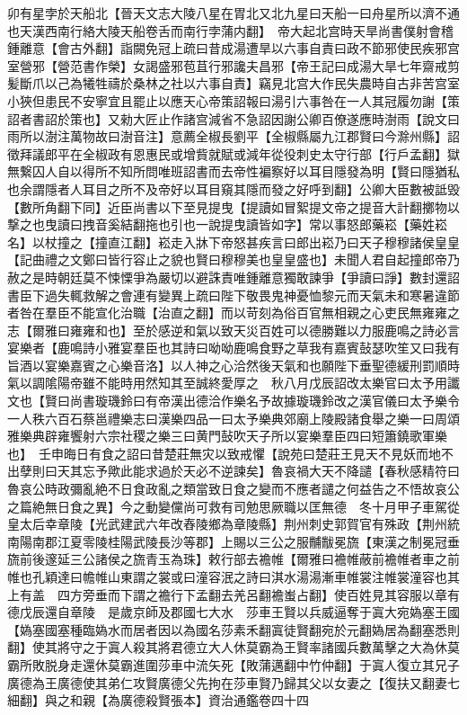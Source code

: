 卯有星孛於天船北【晉天文志大陵八星在胃北又北九星曰天船一曰舟星所以濟不通也天漢西南行絡大陵天船卷舌而南行孛蒲内翻】　帝大起北宫時天旱尚書僕射會稽鍾離意【會古外翻】詣闕免冠上疏曰昔成湯遭旱以六事自責曰政不節邪使民疾邪宫室營邪【營范書作榮】女謁盛邪苞苴行邪讒夫昌邪【帝王記曰成湯大旱七年齋戒剪髪斷爪以己為犧牲禱於桑林之社以六事自責】竊見北宫大作民失農時自古非苦宫室小狹但患民不安寧宜且罷止以應天心帝策詔報曰湯引六事咎在一人其冠履勿謝【策詔者書詔於策也】又勑大匠止作諸宫減省不急詔因謝公卿百僚遂應時澍雨【說文曰雨所以澍注萬物故曰澍音注】意薦全椒長劉平【全椒縣屬九江郡賢曰今滁州縣】詔徵拜議郎平在全椒政有恩惠民或增貲就賦或減年從役刺史太守行部【行戶孟翻】獄無繋囚人自以得所不知所問唯班詔書而去帝性褊察好以耳目隱發為明【賢曰隱猶私也余謂隱者人耳目之所不及帝好以耳目窺其隱而發之好呼到翻】公卿大臣數被詆毁【數所角翻下同】近臣尚書以下至見提曳【提讀如冒絮提文帝之提音大計翻擲物以撃之也曳讀曰拽音奚結翻拖也引也一說提曳讀皆如字】常以事怒郎藥崧【藥姓崧名】以杖撞之【撞直江翻】崧走入牀下帝怒甚疾言曰郎出崧乃曰天子穆穆諸侯皇皇【記曲禮之文鄭曰皆行容止之貌也賢曰穆穆美也皇皇盛也】未聞人君自起撞郎帝乃赦之是時朝廷莫不悚慄爭為嚴切以避誅責唯鍾離意獨敢諫爭【爭讀曰諍】數封還詔書臣下過失輒救解之會連有變異上疏曰陛下敬畏鬼神憂恤黎元而天氣未和寒暑違節者咎在羣臣不能宣化治職【治直之翻】而以苛刻為俗百官無相親之心吏民無雍雍之志【爾雅曰雍雍和也】至於感逆和氣以致天災百姓可以德勝難以力服鹿鳴之詩必言宴樂者【鹿鳴詩小雅宴羣臣也其詩曰呦呦鹿鳴食野之草我有嘉賓鼔瑟吹笙又曰我有旨酒以宴樂嘉賓之心樂音洛】以人神之心洽然後天氣和也願陛下垂聖德緩刑罰順時氣以調隂陽帝雖不能時用然知其至誠終愛厚之　秋八月戊辰詔改太樂官曰太予用讖文也【賢曰尚書璇璣鈴曰有帝漢出德洽作樂名予故據璇璣鈴改之漢官儀曰太予樂令一人秩六百石蔡邕禮樂志曰漢樂四品一曰太予樂典郊廟上陵殿諸食舉之樂一曰周頌雅樂典辟雍饗射六宗社稷之樂三曰黄門鼔吹天子所以宴樂羣臣四曰短簫鐃歌軍樂也】　壬申晦日有食之詔曰昔楚莊無灾以致戒懼【說苑曰楚莊王見天不見妖而地不出孽則曰天其忘予歟此能求過於天必不逆諫矣】魯哀禍大天不降譴【春秋感精符曰魯哀公時政彌亂絶不日食政亂之類當致日食之變而不應者譴之何益告之不悟故哀公之篇絶無日食之異】今之動變儻尚可救有司勉思厥職以匡無德　冬十月甲子車駕從皇太后幸章陵【光武建武六年改舂陵鄉為章陵縣】荆州刺史郭賀官有殊政【荆州統南陽南郡江夏零陵桂陽武陵長沙等郡】上賜以三公之服黼黻冕旒【東漢之制冕冠垂旒前後邃延三公諸侯之旒青玉為珠】敕行部去襜帷【爾雅曰襜帷蔽前襜帷者車之前帷也孔穎達曰幨帷山東謂之裳或曰潼容泯之詩曰淇水湯湯漸車帷裳注帷裳潼容也其上有盖　四方旁垂而下謂之襜行下孟翻去羌呂翻襜蚩占翻】使百姓見其容服以章有德戊辰還自章陵　是歲京師及郡國七大水　莎車王賢以兵威逼奪于寘大宛媯塞王國【媯塞國塞種臨媯水而居者因以為國名莎素禾翻寘徒賢翻宛於元翻媯居為翻塞悉則翻】使其將守之于寘人殺其將君德立大人休莫霸為王賢率諸國兵數萬擊之大為休莫霸所敗脱身走還休莫霸進圍莎車中流矢死【敗蒲邁翻中竹仲翻】于寘人復立其兄子廣德為王廣德使其弟仁攻賢廣德父先拘在莎車賢乃歸其父以女妻之【復扶又翻妻七細翻】與之和親【為廣德殺賢張本】資治通鑑卷四十四  
    


